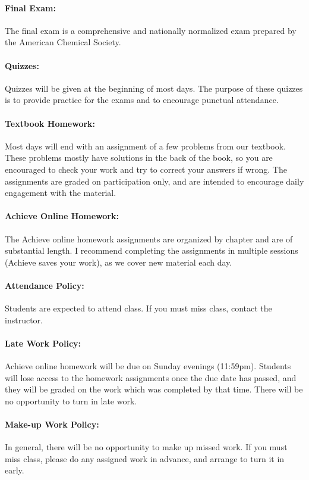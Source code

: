 \documentclass[12pt, letterpaper]{article}
\begin{document}
\paragraph{Final Exam:}
The final exam is a comprehensive and nationally normalized exam prepared by the American Chemical Society.

\paragraph{Quizzes:}
Quizzes will be given at the beginning of most days. The purpose of these quizzes is to provide practice for the exams and to encourage punctual attendance.

\paragraph{Textbook Homework:}
Most days will end with an assignment of a few problems from our textbook. These problems mostly have solutions in the back of the book, so you are encouraged to check your work and try to correct your answers if wrong. The assignments are graded on participation only, and are intended to encourage daily engagement with the material.

\paragraph{Achieve Online Homework:}
The Achieve online homework assignments are organized by chapter and are of substantial length. I recommend completing the assignments in multiple sessions (Achieve saves your work), as we cover new material each day.

\paragraph{Attendance Policy:}
Students are expected to attend class. If you must miss class, contact the instructor.

\paragraph{Late Work Policy:}
Achieve online homework will be due on Sunday evenings (11:59pm). Students will lose access to the homework assignments once the due date has passed, and they will be graded on the work which was completed by that time. There will be no opportunity to turn in late work.

\paragraph{Make-up Work Policy:}
In general, there will be no opportunity to make up missed work. If you must miss class, please do any assigned work in advance, and arrange to turn it in early.
\end{document}
